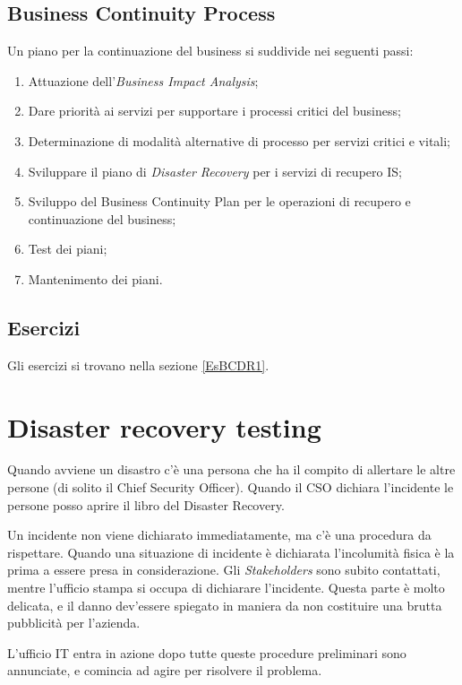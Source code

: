 \subsection{Business Continuity Process}

Un piano per la continuazione del business si suddivide nei seguenti passi:
\begin{enumerate}
  \item Attuazione dell'\textit{Business Impact Analysis};
  \item Dare priorità ai servizi per supportare i processi critici del business;
  \item Determinazione di modalità alternative di processo per servizi critici
  e vitali;
  \item Sviluppare il piano di \textit{Disaster Recovery} per i servizi di
  recupero IS;
  \item Sviluppo del Business Continuity Plan per le operazioni di recupero e
  continuazione del business;
  \item Test dei piani;
  \item Mantenimento dei piani.
\end{enumerate}

\subsection{Esercizi}

Gli esercizi si trovano nella sezione \ref{EsBCDR1}.

\section{Disaster recovery testing}

Quando avviene un disastro c'è una persona che ha il compito di allertare le
altre persone (di solito il Chief Security Officer). Quando il CSO dichiara 
l'incidente le persone posso aprire il libro del Disaster Recovery.

Un incidente non viene dichiarato immediatamente, ma c'è una procedura da
rispettare. Quando una situazione di incidente è dichiarata l'incolumità fisica
è la prima a essere presa in considerazione. Gli \textit{Stakeholders} sono
subito contattati, mentre l'ufficio stampa si occupa di dichiarare l'incidente.
Questa parte è molto delicata, e il danno dev'essere spiegato in maniera da non
costituire una brutta pubblicità per l'azienda.

L'ufficio IT entra in azione dopo tutte queste procedure preliminari sono
annunciate, e comincia ad agire per risolvere il problema.

